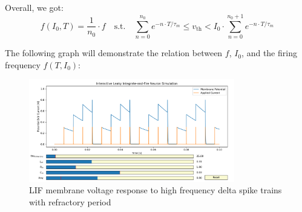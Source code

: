 Overall, we got:
\begin{equation}
f(I_0, T) = \frac{1}{n_0} \cdot f \quad \text{s.t.} \quad \sum_{n=0}^{n_0} e^{-n \cdot T/\tau_m} \leq v_{\text{th}} < I_0 \cdot \sum_{n=0}^{n_0+1} e^{-n \cdot T/\tau_m}
\end{equation}

The following graph will demonstrate the relation between \(f\), \(I_0\), and the firing frequency \(f(T, I_0)\):

\begin{figure}[H]
    \centering
    \includegraphics[width=0.8\textwidth]{scientific-background/computational-models/LIF/graphs/LIF-high-freq-spike-response-ref-final.png}
    \caption{LIF membrane voltage response to high frequency delta spike trains with refractory period}
    \label{fig:LIF-high-freq-spike-ref-final}
\end{figure}
